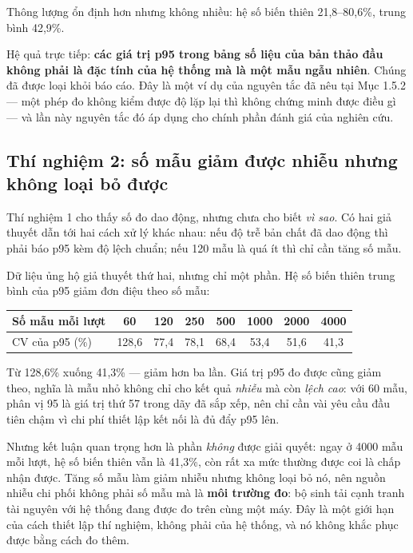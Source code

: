 Thông lượng ổn định hơn nhưng không nhiều: hệ số biến thiên 21,8--80,6\%, trung bình 42,9\%.

Hệ quả trực tiếp: \textbf{các giá trị p95 trong bảng số liệu của bản thảo đầu không phải là đặc tính của hệ thống mà là một mẫu ngẫu nhiên}. Chúng đã được loại khỏi báo cáo. Đây là một ví dụ của nguyên tắc đã nêu tại Mục 1.5.2 --- một phép đo không kiểm được độ lặp lại thì không chứng minh được điều gì --- và lần này nguyên tắc đó áp dụng cho chính phần đánh giá của nghiên cứu.

\subsection{Thí nghiệm 2: số mẫu giảm được nhiễu nhưng không loại bỏ được}

Thí nghiệm 1 cho thấy số đo dao động, nhưng chưa cho biết \emph{vì sao}. Có hai giả thuyết dẫn tới hai cách xử lý khác nhau: nếu độ trễ bản chất đã dao động thì phải báo p95 kèm độ lệch chuẩn; nếu 120 mẫu là quá ít thì chỉ cần tăng số mẫu.





Dữ liệu ủng hộ giả thuyết thứ hai, nhưng chỉ một phần. Hệ số biến thiên trung bình của p95 giảm đơn điệu theo số mẫu:

\begin{center}
\footnotesize
\begin{tabular}{l|ccccccc}
Số mẫu mỗi lượt & 60 & 120 & 250 & 500 & 1000 & 2000 & 4000 \\
\hline
CV của p95 (\%) & 128,6 & 77,4 & 78,1 & 68,4 & 53,4 & 51,6 & 41,3 \\
\end{tabular}
\end{center}

Từ 128,6\% xuống 41,3\% --- giảm hơn ba lần. Giá trị p95 đo được cũng giảm theo, nghĩa là mẫu nhỏ không chỉ cho kết quả \emph{nhiễu} mà còn \emph{lệch cao}: với 60 mẫu, phân vị 95 là giá trị thứ 57 trong dãy đã sắp xếp, nên chỉ cần vài yêu cầu đầu tiên chậm vì chi phí thiết lập kết nối là đủ đẩy p95 lên.

Nhưng kết luận quan trọng hơn là phần \emph{không} được giải quyết: ngay ở 4000 mẫu mỗi lượt, hệ số biến thiên vẫn là 41,3\%, còn rất xa mức thường được coi là chấp nhận được. Tăng số mẫu làm giảm nhiễu nhưng không loại bỏ nó, nên nguồn nhiễu chi phối không phải số mẫu mà là \textbf{môi trường đo}: bộ sinh tải cạnh tranh tài nguyên với hệ thống đang được đo trên cùng một máy. Đây là một giới hạn của cách thiết lập thí nghiệm, không phải của hệ thống, và nó không khắc phục được bằng cách đo thêm.

